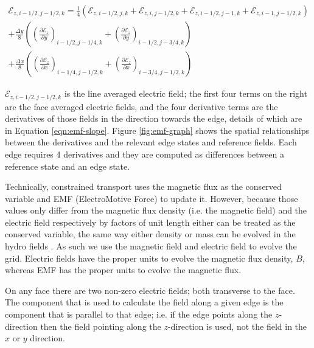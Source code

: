 \documentclass[modern, linenumbers]{aastex631}
\begin{document}
\begin{equation}
    \label{eqn:emf-edge}
    \begin{aligned}
        \mathcal{E}_{z, i-1/2, j-1/2, k} = \frac{1}{4} \left(
              \mathcal{E}_{z, i-1/2, j, k}
            + \mathcal{E}_{z, i, j-1/2, k}
            + \mathcal{E}_{z, i-1/2, j-1, k}
            + \mathcal{E}_{z, i-1, j-1/2, k}\right) \\
        + \frac{\Delta y}{8} \left( \left( \frac{\partial \mathcal{E}_z }{\partial y} \right)_{i-1/2, j-1/4, k} + \left(  \frac{\partial \mathcal{E}_z }{\partial y} \right)_{i-1/2, j-3/4, k} \right) \\
        + \frac{\Delta x}{8} \left( \left( \frac{\partial \mathcal{E}_z }{\partial x} \right)_{i-1/4, j-1/2, k} + \left(  \frac{\partial \mathcal{E}_z }{\partial x} \right)_{i-3/4, j-1/2, k} \right)
    \end{aligned}
\end{equation}

$\mathcal{E}_{z, i-1/2, j-1/2, k}$ is the line averaged electric field; the first four terms on the right are the face averaged electric fields, and the four derivative terms are the derivatives of those fields in the direction towards the edge, details of which are in Equation \ref{eqn:emf-slope}. Figure \ref{fig:emf-graph} shows the spatial relationships between the derivatives and the relevant edge states and reference fields. Each edge requires 4 derivatives and they are computed as differences between a reference state and an edge state.

Technically, constrained transport uses the magnetic flux as the conserved variable and EMF (ElectroMotive Force) to update it. However, because those values only differ from the magnetic flux density (i.e. the magnetic field) and the electric field respectively by factors of unit length either can be treated as the conserved variable, the same way either density or mass can be evolved in the hydro fields \citep{stone_athena_2008}. As such we use the magnetic field and electric field to evolve the grid. Electric fields have the proper units to evolve the magnetic flux density, $ B $, whereas EMF has the proper units to evolve the magnetic flux.

On any face there are two non-zero electric fields; both transverse to the face. The component that is used to calculate the field along a given edge is the component that is parallel to that edge; i.e. if the edge points along the $ z $-direction then the field pointing along the $ z $-direction is used, not the field in the $ x $ or $ y $ direction.
\end{document}
